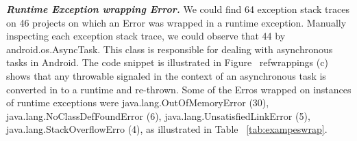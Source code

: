 \documentclass[conference]{IEEEtran}
\begin{document}




\emph{\textbf{Runtime Exception wrapping Error.}} We could find  64 exception stack traces 
on 46 projects on which an Error was wrapped in a runtime exception.
Manually inspecting each exception stack trace, we could observe that 44%
by android.os.AsyncTask. This class is responsible for dealing with asynchronous tasks in Android.
The code snippet is illustrated in Figure ~ref{wrappings} (c) shows that any throwable signaled in the context of an asynchronous 
task is converted in to a runtime and re-thrown. Some of the Erros wrapped on instances of runtime exceptions were 
java.lang.OutOfMemoryError (30), java.lang.NoClassDefFoundError (6), 
java.lang.UnsatisfiedLinkError (5), java.lang.StackOverflowErro (4), as illustrated in Table ~\ref{tab:exampeswrap}.
\end{document}
